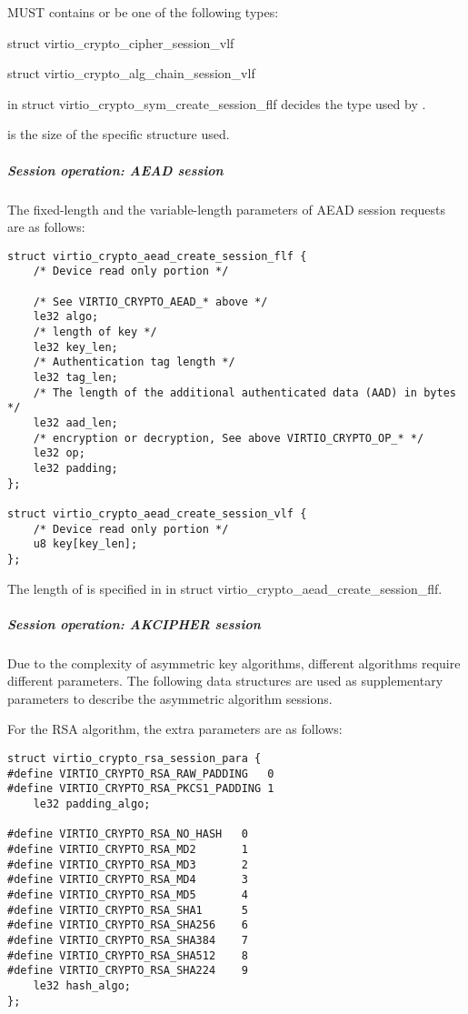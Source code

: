  MUST contains or be one of the following types:
\begin{itemize*}
\item struct virtio_crypto_cipher_session_vlf
\item struct virtio_crypto_alg_chain_session_vlf
\end{itemize*}

 in struct virtio_crypto_sym_create_session_flf decides the
type used by .

 is the size of the specific structure used.


\subparagraph{Session operation: AEAD session}\label{sec:Device Types / Crypto Device / Device
Operation / Control Virtqueue / Session operation / Session operation: AEAD session}

The fixed-length and the variable-length parameters of AEAD session requests are as follows:

\begin{lstlisting}
struct virtio_crypto_aead_create_session_flf {
    /* Device read only portion */

    /* See VIRTIO_CRYPTO_AEAD_* above */
    le32 algo;
    /* length of key */
    le32 key_len;
    /* Authentication tag length */
    le32 tag_len;
    /* The length of the additional authenticated data (AAD) in bytes */
    le32 aad_len;
    /* encryption or decryption, See above VIRTIO_CRYPTO_OP_* */
    le32 op;
    le32 padding;
};

struct virtio_crypto_aead_create_session_vlf {
    /* Device read only portion */
    u8 key[key_len];
};
\end{lstlisting}

The length of  is specified in  in struct
virtio_crypto_aead_create_session_flf.

\subparagraph{Session operation: AKCIPHER session}\label{sec:Device Types / Crypto Device / Device
Operation / Control Virtqueue / Session operation / Session operation: AKCIPHER session}

Due to the complexity of asymmetric key algorithms, different algorithms
require different parameters. The following data structures are used as
supplementary parameters to describe the asymmetric algorithm sessions.

For the RSA algorithm, the extra parameters are as follows:
\begin{lstlisting}
struct virtio_crypto_rsa_session_para {
#define VIRTIO_CRYPTO_RSA_RAW_PADDING   0
#define VIRTIO_CRYPTO_RSA_PKCS1_PADDING 1
    le32 padding_algo;

#define VIRTIO_CRYPTO_RSA_NO_HASH   0
#define VIRTIO_CRYPTO_RSA_MD2       1
#define VIRTIO_CRYPTO_RSA_MD3       2
#define VIRTIO_CRYPTO_RSA_MD4       3
#define VIRTIO_CRYPTO_RSA_MD5       4
#define VIRTIO_CRYPTO_RSA_SHA1      5
#define VIRTIO_CRYPTO_RSA_SHA256    6
#define VIRTIO_CRYPTO_RSA_SHA384    7
#define VIRTIO_CRYPTO_RSA_SHA512    8
#define VIRTIO_CRYPTO_RSA_SHA224    9
    le32 hash_algo;
};
\end{lstlisting}

